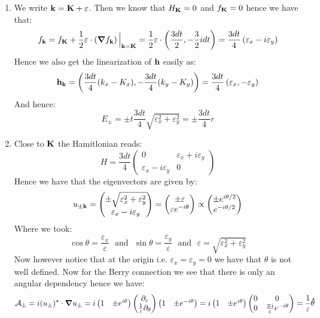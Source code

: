 \documentclass[10pt,a4paper]{article}
\begin{document}
\begin{enumerate}
\item We write $\vb{k} = \vb{K} + \vb{\varepsilon}$. Then we know that $H_{\vb{K}} = 0$ and $f_{\vb{K}} = 0$ hence we have that:
\[
f_{\vb{k}} = f_{\vb{K}}  + \frac{1}{2}\vb{\varepsilon} \cdot \left(\grad f_{\vb{k}} \right) \Big|_{\vb{k} = \vb{K}} = \frac{1}{2} \vb{\varepsilon} \cdot \left( \frac{3 d t}{2}, - \frac{3}{2} i d t  \right) = \frac{3dt}{4}\left( \varepsilon_x - i \varepsilon_y \right)
\] 
Hence we also get the linearization of $\vb{h}$ easily as:
\[
\vb{h}_{\vb{k}} = \left(\frac{3dt}{4} (k_x - K_x), -\frac{3 dt}{4} (k_y - K_y)\right)  = \frac{3 dt}{4}\left(\varepsilon_x, - \varepsilon_y \right)
\]
And hence:
\[
E_\pm = \pm t \frac{3 dt}{4} \sqrt{\varepsilon_x^2 + \varepsilon_y^2} = \pm \frac{3 d t}{4} r 
\]

\item Close to $\vb{K}$ the Hamitlonian reads:
\[
H = \frac{3 d t}{4}\begin{pmatrix}
0 & \varepsilon_x + i \varepsilon_y\\
\varepsilon_x - i \varepsilon_y & 0 
\end{pmatrix}
\]
Hence we have that the eigenvectors are given by:
\[
u_{\pm \vb{k}} = \begin{pmatrix}
\pm \sqrt{\varepsilon_x^2 + \varepsilon_y^2}\\
\varepsilon_x - i \varepsilon_y
\end{pmatrix} = \begin{pmatrix}
\pm \varepsilon\\
\varepsilon e^{-i \theta}
\end{pmatrix} \propto \begin{pmatrix}
\pm e^{i \theta/2}\\
e^{-i\theta/2}
\end{pmatrix}
\]
Where we took:
\[
\cos \theta = \frac{\varepsilon_x}{\varepsilon} \mbox{~~and~~} \sin \theta = \frac{\varepsilon_y}{\varepsilon} \mbox{~~and~~} \varepsilon = \sqrt{\varepsilon_x^2 + \varepsilon_y^2}
\]
Now however notice that at the origin i.e. $\varepsilon_x = \varepsilon_y = 0$ we have that $\theta$ is not well defined. Now for the Berry connection we see that there is only an angular dependency hence we have:
\[
\mathcal{A}_{\pm} = i (u_{\pm})^\star \cdot \grad u_{\pm} = i \begin{pmatrix}
1 & \pm e^{i \theta}
\end{pmatrix} \begin{pmatrix}
\partial_{\varepsilon} \\
\frac{1}{\varepsilon} \partial_\theta
\end{pmatrix}
\begin{pmatrix}
1 & \pm e^{-i \theta}
\end{pmatrix} = 
i \begin{pmatrix}
1 & \pm e^{i \theta}
\end{pmatrix} \begin{pmatrix}
0 & 0\\
0 & \frac{\mp i}{\varepsilon}e^{-i\theta}
\end{pmatrix} = \frac{1}{\varepsilon} \vu{\theta}
\]


\end{enumerate}
\end{document}
